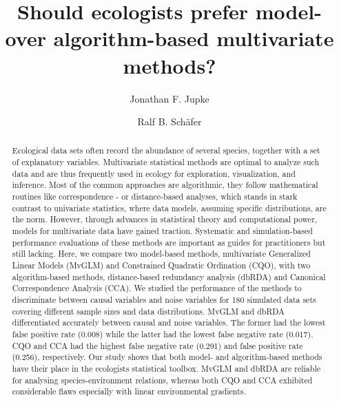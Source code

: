 \documentclass[a4paper,11pt]{article}
\title{Should ecologists prefer model- over algorithm-based multivariate methods?}
\author[1]{Jonathan F. Jupke}
\author[1]{Ralf B. Schäfer}
\affil[1]{iES Landau, Institute for Environmental Sciences, University Koblenz-Landau, Fortstraße 7, 76829 Landau, Germany}%
\date{}
\begin{document}

    \maketitle


        \begin{abstract}%
            Ecological data sets often record the abundance of several species, together with a set of explanatory variables. 
            Multivariate statistical methods are optimal to analyze such data and are thus frequently used in ecology for exploration, visualization, and inference. 
            Most of the common approaches are algorithmic, they follow mathematical routines like correspondence - or distance-based analyses, which stands in stark contrast to univariate statistics, where data models, assuming specific distributions, are the norm.
            However, through advances in statistical theory and computational power, models for multivariate data have gained traction. 
            Systematic and simulation-based performance evaluations of these methods are important as guides for practitioners but still lacking.
            Here, we compare two model-based methods, multivariate Generalized Linear Models (MvGLM) and Constrained Quadratic Ordination (CQO), with two algorithm-based methods, distance-based redundancy analysis (dbRDA) and Canonical Correspondence Analysis (CCA).
            We studied the performance of the methods to discriminate between causal variables and noise variables for 180 simulated data sets covering different sample sizes and data distributions.
            MvGLM and dbRDA differentiated accurately between causal and noise variables.
            The former had the lowest false positive rate (0.008) while the latter had the lowest false negative rate (0.017).
            CQO and CCA had the highest false negative rate (0.291) and false positive rate (0.256), respectively. 
           Our study shows that both model- and algorithm-based methods have their place in the ecologists statistical toolbox. 
        MvGLM and dbRDA are reliable for analysing species-environment relations, whereas both CQO and CCA exhibited considerable flaws especially with linear environmental gradients. 
           
        \end{abstract}
\end{document}
